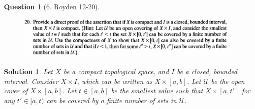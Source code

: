 \documentclass{article} %
\theoremstyle{quest}
\newtheorem*{question}{Question}
\newtheorem*{solution}{Solution}
\begin{document}
\pagebreak

\begin{question}[6. Royden 12-20]
\hfill
\begin{figure}[h!]
  \centering
    \includegraphics[width=1\textwidth]{12-20}
\end{figure}
\end{question}
\begin{solution}
Let $X$ be a compact topological space, and $I$ be a closed, bounded
interval. Consider $X \times I$, which can be written as $X \times [a,b]$.
Let $\mathscr{U}$ be the open cover of $X \times [a,b]$. Let $t \in [a,b]$
be the smallest value such that $X \times [a,t']$ for any $t' \in
[a,t)$ can be covered by a finite number of sets in $\mathscr{U}$. 
\end{solution}
\end{document}
